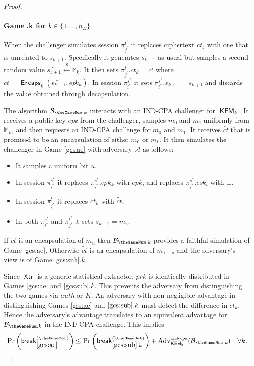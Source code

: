 \documentclass[USenglish,oneside,twocolumn]{article}
\theoremstyle{dgthm}
\theoremstyle{dgdef}
\newcounter{GameSet}
\newcounter{GameNum}[GameSet]
\newcommand{\Protocol}[1]{\operatorname{\mathsf{#1}}}
\newcommand{\samples}{\xleftarrow{\$}}
\newcommand{\AlgorithmName}[1]{\operatorname{\mathsf{#1}}}
\newcommand{\Encaps}{\AlgorithmName{Encaps}}
\newcommand{\XTR}{\AlgorithmName{Xtr}}
\newcommand{\p}[2]{\pi_{#1}^{#2}}
\newcommand{\Oracle}[1]{\mathcal #1}
\newcommand{\brk}[1]{\mathsf{break}_{#1}^{(\theGameSet)}}
\newcommand{\Prb}[1]{\mathrm{Pr}\left(\brk{#1}\right)}
\newcommand{\Experiment}[1]{\operatorname{\tt{#1}}}
\newcommand{\Algorithm}[1]{\mathcal #1}
\newcommand{\AdvName}[2]{\operatorname{\mathrm{Adv}_{\Protocol{#1}}^{\Experiment{#2}}}}
\newcommand{\Adv}[3]{\AdvName{#1}{#2}(\Algorithm{#3})}
\newcommand{\IndCpa}[2]{\Adv{#1}{ind-cpa}{#2}}
\begin{document}
\begin{proof}
  \paragraph*{Game \theGameNum.k for $k \in \{1, \dots, n_E\}$}
  When the challenger simulates session $\p{j^*}{t^*}$ it replaces ciphertext
  $ct_k$ with one that is unrelated to $s_{k+1}$. Specifically it generates
  $s_{k+1}$ as usual but samples a second random value
  $\widetilde{s_{k+1}} \samples \mathbb{M}_k$. It then sets $\p{j^*}{t^*}.ct_k =
  \widetilde{ct}$ where $\widetilde{ct} = \Encaps_k(\widetilde{s_{k+1}}, epk_k)$.
  In session $\p{i^*}{s^*}$ it sets $\p{i^*}{s^*}.s_{k+1} = s_{k+1}$ and
  discards the value obtained through decapsulation.

  The algorithm $\Oracle{B}_{\theGameNum.k}$ interacts with an IND-CPA
  challenger for $\AlgorithmName{KEM}_k$. It receives a public key
  $\widetilde{epk}$ from the challenger, samples $m_0$ and $m_1$ uniformly from
  $\mathbb{M}_k$, and then requests an IND-CPA challenge for $m_0$ and $m_1$.
  It receives $\widetilde{ct}$ that is promised to be an encapsulation of either
  $m_0$ or $m_1$. It then simulates the challenger in Game \ref{gcs:ae} with
  adversary $\Oracle{A}$ as follows:
  \begin{itemize}
    \item It samples a uniform bit $u$.
    \item In session $\p{i^*}{s^*}$ it replaces $\p{i^*}{s^*}.epk_k$ with $\widetilde{epk}$,
      and replaces $\p{i^*}{s^*}.esk_i$ with $\bot$.
    \item In session $\p{j^*}{t^*}$ it replaces $ct_k$ with $\widetilde{ct}$.
    \item In both $\p{i^*}{s^*}$ and $\p{j^*}{t^*}$ it sets $s_{k+1} = m_u$.
  \end{itemize}

  \break
  If $\widetilde{ct}$ is an encapsulation of $m_u$ then
  $\Oracle{B}_{\theGameNum.k}$ provides a faithful simulation of Game
  \ref{gcs:ae}. Otherwise $\widetilde{ct}$ is an encapsulation of $m_{1-u}$ and
  the adversary's view is of Game \ref{gcs:sub}$.k$.

  Since $\XTR$ is a generic statistical extractor, $prk$ is identically
  distributed in Games \ref{gcs:ae} and \ref{gcs:sub}$.k$. This prevents the
  adversary from distinguishing the two games via $auth$ or $K$. An adversary
  with non-negligible advantage in distinguishing Games \ref{gcs:ae} and
  $\ref{gcs:sub}.k$ must detect the difference in $ct_k$.  Hence the adversary's
  advantage translates to an equivalent advantage for
  $\Oracle{B_{\theGameNum.k}}$ in the IND-CPA challenge. This implies
  \begin{equation} \label{eq:subadv}
    \Prb{\ref{gcs:ae}} \le \Prb{\ref{gcs:sub}.k} + \IndCpa{KEM_k}{B_{\theGameNum.k}} \quad \forall k.
  \end{equation}


\end{proof}
\end{document}
